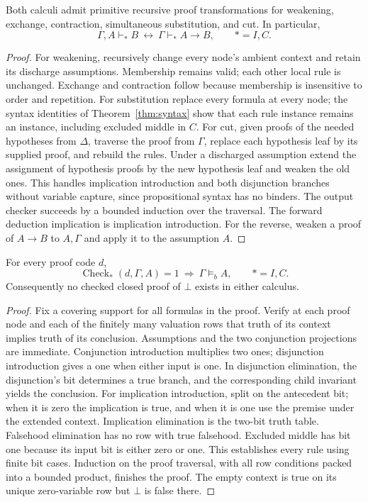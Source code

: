 \begin{theorem}\label{thm:structural}
Both calculi admit primitive recursive proof transformations for weakening,
exchange, contraction, simultaneous substitution, and cut. In particular,
\[
 \Gamma,A\vdash_* B\ \leftrightarrow\ \Gamma\vdash_* A\to B,
 \qquad *=I,C.
\]
\end{theorem}
\begin{proof}
For weakening, recursively change every node's ambient context and retain
its discharge assumptions. Membership remains valid; each other local
rule is unchanged. Exchange and contraction follow because membership is
insensitive to order and repetition. For substitution replace every formula
at every node; the syntax identities of Theorem~\ref{thm:syntax} show that
each rule instance remains an instance, including excluded middle in $C$.
For cut, given proofs of the needed hypotheses from $\Delta$, traverse the
proof from $\Gamma$, replace each hypothesis leaf by its supplied proof,
and rebuild the rules. Under a discharged assumption extend the assignment
of hypothesis proofs by the new hypothesis leaf and weaken the old ones.
This handles implication introduction and both disjunction branches without
variable capture, since propositional syntax has no binders. The output
checker succeeds by a bounded induction over the traversal. The forward
deduction implication is implication introduction. For the reverse, weaken
a proof of $A\to B$ to $A,\Gamma$ and apply it to the assumption $A$.
\end{proof}

\begin{theorem}\label{thm:bool-sound}
For every proof code $d$,
\[
 \operatorname{Check}_*(d,\Gamma,A)=1\ \Longrightarrow\ \Gamma\models_b A,
 \qquad *=I,C.
\]
Consequently no checked closed proof of $\bot$ exists in either calculus.
\end{theorem}
\begin{proof}
Fix a covering support for all formulas in the proof. Verify at each proof
node and each of the finitely many valuation rows that truth of its context
implies truth of its conclusion. Assumptions and the two conjunction
projections are immediate. Conjunction introduction multiplies two ones;
disjunction introduction gives a one when either input is one. In
disjunction elimination, the disjunction's bit determines a true branch,
and the corresponding child invariant yields the conclusion. For
implication introduction, split on the antecedent bit; when it is zero the
implication is true, and when it is one use the premise under the extended
context. Implication elimination is the two-bit truth table. Falsehood
elimination has no row with true falsehood. Excluded middle has bit one
because its input bit is either zero or one. This establishes every rule
using finite bit cases. Induction on the proof traversal, with all row
conditions packed into a bounded product, finishes the proof. The empty
context is true on its unique zero-variable row but $\bot$ is false there.
\end{proof}

